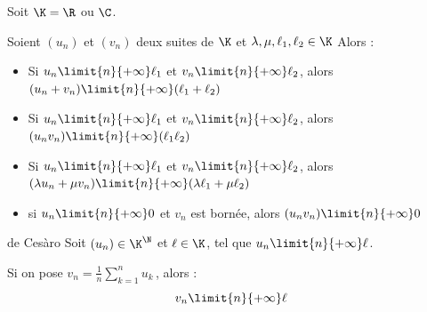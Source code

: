 \begin{theoreme}{}{}
    Soit $\K = \R$ ou $\C$. 

    Soient $(u_n)$ et $(v_n)$ deux suites de $\K$ et $\lambda, \mu, \ell_1, \ell_2 \in \K$ Alors : 

    \begin{itemize}
        \item Si $u_n \limit{n}{+\infty} \ell_1$ et $v_n \limit{n}{+\infty} \ell_2$, alors $(u_n + v_n) \limit{n}{+\infty} (\ell_1 + \ell_2)$
        \item Si $u_n \limit{n}{+\infty} \ell_1$ et $v_n \limit{n}{+\infty} \ell_2$, alors $(u_n v_n) \limit{n}{+\infty} (\ell_1 \ell_2)$
        \item Si $u_n \limit{n}{+\infty} \ell_1$ et $v_n \limit{n}{+\infty} \ell_2$, alors $(\lambda u_n + \mu v_n) \limit{n}{+\infty} (\lambda \ell_1 + \mu \ell_2)$
        \item si $u_n \limit{n}{+\infty} 0$ et $v_n$ est bornée, alors $(u_n v_n) \limit{n}{+\infty} 0$
    \end{itemize}
\end{theoreme}

\begin{theoreme}{de Cesàro}{}
    Soit $(u_n) \in \K^{\N}$ et $\ell \in \K$, tel que $u_n \limit{n}{+\infty} \ell$.
    
    Si on pose $\displaystyle v_n = \frac 1 n \sum_{k=1}^n u_k$\,, alors :
    \[v_n \limit{n}{+\infty} \ell\]
\end{theoreme}


